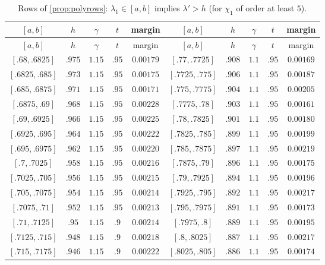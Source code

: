 \begin{center}
\scriptsize
\begin{longtable}{@{}ccccc@{\qquad}ccccc@{}}
\caption{Rows of \cref{prop:polyrows}: $\lambda_1\in[a,b]$ implies $\lambda'>h$ (for $\chi_1$ of order at least $5$).}\label{tab:polyrows}\\
\toprule
$[a,b]$ & $h$ & $\gamma$ & $t$ & margin & $[a,b]$ & $h$ & $\gamma$ & $t$ & margin \\
\midrule
\endfirsthead
\toprule
$[a,b]$ & $h$ & $\gamma$ & $t$ & margin & $[a,b]$ & $h$ & $\gamma$ & $t$ & margin \\
\midrule
\endhead
\bottomrule
\endfoot
$[.68,.6825]$ & $.975$ & $1.15$ & $.95$ & $0.00179$ & $[.77,.7725]$ & $.908$ & $1.1$ & $.95$ & $0.00169$ \\
$[.6825,.685]$ & $.973$ & $1.15$ & $.95$ & $0.00175$ & $[.7725,.775]$ & $.906$ & $1.1$ & $.95$ & $0.00187$ \\
$[.685,.6875]$ & $.971$ & $1.15$ & $.95$ & $0.00171$ & $[.775,.7775]$ & $.904$ & $1.1$ & $.95$ & $0.00205$ \\
$[.6875,.69]$ & $.968$ & $1.15$ & $.95$ & $0.00228$ & $[.7775,.78]$ & $.903$ & $1.1$ & $.95$ & $0.00161$ \\
$[.69,.6925]$ & $.966$ & $1.15$ & $.95$ & $0.00225$ & $[.78,.7825]$ & $.901$ & $1.1$ & $.95$ & $0.00180$ \\
$[.6925,.695]$ & $.964$ & $1.15$ & $.95$ & $0.00222$ & $[.7825,.785]$ & $.899$ & $1.1$ & $.95$ & $0.00199$ \\
$[.695,.6975]$ & $.962$ & $1.15$ & $.95$ & $0.00220$ & $[.785,.7875]$ & $.897$ & $1.1$ & $.95$ & $0.00219$ \\
$[.7,.7025]$ & $.958$ & $1.15$ & $.95$ & $0.00216$ & $[.7875,.79]$ & $.896$ & $1.1$ & $.95$ & $0.00175$ \\
$[.7025,.705]$ & $.956$ & $1.15$ & $.95$ & $0.00215$ & $[.79,.7925]$ & $.894$ & $1.1$ & $.95$ & $0.00196$ \\
$[.705,.7075]$ & $.954$ & $1.15$ & $.95$ & $0.00214$ & $[.7925,.795]$ & $.892$ & $1.1$ & $.95$ & $0.00217$ \\
$[.7075,.71]$ & $.952$ & $1.15$ & $.95$ & $0.00213$ & $[.795,.7975]$ & $.891$ & $1.1$ & $.95$ & $0.00173$ \\
$[.71,.7125]$ & $.95$ & $1.15$ & $.9$ & $0.00214$ & $[.7975,.8]$ & $.889$ & $1.1$ & $.95$ & $0.00195$ \\
$[.7125,.715]$ & $.948$ & $1.15$ & $.9$ & $0.00218$ & $[.8,.8025]$ & $.887$ & $1.1$ & $.95$ & $0.00217$ \\
$[.715,.7175]$ & $.946$ & $1.15$ & $.9$ & $0.00222$ & $[.8025,.805]$ & $.886$ & $1.1$ & $.95$ & $0.00174$ \\

\end{longtable}
\end{center}
